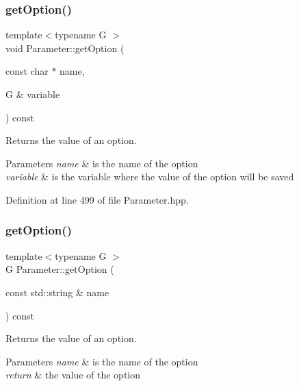 \subsubsection{\texorpdfstring{get\+Option()}{getOption()}\hspace{0.1cm}{\footnotesize\ttfamily [2/8]}}
{\footnotesize\ttfamily template$<$typename G $>$ \\
void Parameter\+::get\+Option (\begin{DoxyParamCaption}\item[{const char $\ast$}]{name,  }\item[{G \&}]{variable }\end{DoxyParamCaption}) const\hspace{0.3cm}{\ttfamily [inline]}}



Returns the value of an option. 


\begin{DoxyParams}{Parameters}
{\em name} & is the name of the option \\
\hline
{\em variable} & is the variable where the value of the option will be saved \\
\hline
\end{DoxyParams}


Definition at line 499 of file Parameter.\+hpp.

\mbox{\label{classParameter_ad3dadcf78f805cbdebabe78a2b74ec07}} 
\subsubsection{\texorpdfstring{get\+Option()}{getOption()}\hspace{0.1cm}{\footnotesize\ttfamily [3/8]}}
{\footnotesize\ttfamily template$<$typename G $>$ \\
G Parameter\+::get\+Option (\begin{DoxyParamCaption}\item[{const std\+::string \&}]{name }\end{DoxyParamCaption}) const\hspace{0.3cm}{\ttfamily [inline]}}



Returns the value of an option. 


\begin{DoxyParams}{Parameters}
{\em name} & is the name of the option \\
\hline
{\em return} & the value of the option \\
\hline
\end{DoxyParams}


